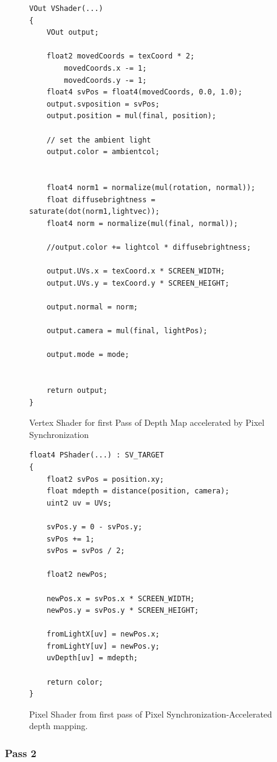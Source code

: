 \documentclass[a4paper, 12pt]{article}
\begin{document}
\begin{figure}[!htb]
\begin{lstlisting}[breaklines=true, language=HLSL]
VOut VShader(...)
{
	VOut output;

	float2 movedCoords = texCoord * 2;
		movedCoords.x -= 1;
		movedCoords.y -= 1;
	float4 svPos = float4(movedCoords, 0.0, 1.0);
	output.svposition = svPos;
	output.position = mul(final, position);

	// set the ambient light
	output.color = ambientcol;

	
	float4 norm1 = normalize(mul(rotation, normal));
	float diffusebrightness = saturate(dot(norm1,lightvec));
	float4 norm = normalize(mul(final, normal));

	//output.color += lightcol * diffusebrightness;

	output.UVs.x = texCoord.x * SCREEN_WIDTH;
	output.UVs.y = texCoord.y * SCREEN_HEIGHT;

	output.normal = norm;

	output.camera = mul(final, lightPos);

	output.mode = mode;


	return output;
}
\end{lstlisting}
\caption{Vertex Shader for first Pass of Depth Map accelerated by Pixel 
Synchronization}
\label{code:VShaderPSDepth}
\end{figure}

\begin{figure}[!htb]

\begin{lstlisting}[breaklines=true, language=HLSL]
float4 PShader(...) : SV_TARGET 
{
	float2 svPos = position.xy;
	float mdepth = distance(position, camera);
	uint2 uv = UVs;

	svPos.y = 0 - svPos.y;
	svPos += 1;
	svPos = svPos / 2;

	float2 newPos;

	newPos.x = svPos.x * SCREEN_WIDTH;
	newPos.y = svPos.y * SCREEN_HEIGHT;

	fromLightX[uv] = newPos.x;
	fromLightY[uv] = newPos.y;
	uvDepth[uv] = mdepth;

	return color;
}
\end{lstlisting}
\caption{Pixel Shader from first pass of Pixel Synchronization-Accelerated 
depth mapping.}
\label{code:PixelShaderPSDepth}
\end{figure}

\subsubsection{Pass 2}
\end{document}
